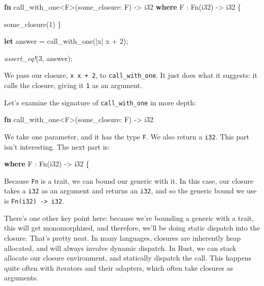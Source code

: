 \documentclass[a4paper,]{book}
\newenvironment{Shaded}{\begin{snugshade}}{\end{snugshade}}
\newcommand{\KeywordTok}[1]{\textcolor[rgb]{0.13,0.29,0.53}{\textbf{{#1}}}}
\newcommand{\DataTypeTok}[1]{\textcolor[rgb]{0.13,0.29,0.53}{{#1}}}
\newcommand{\DecValTok}[1]{\textcolor[rgb]{0.00,0.00,0.81}{{#1}}}
\newcommand{\BuiltInTok}[1]{{#1}}
\newcommand{\PreprocessorTok}[1]{\textcolor[rgb]{0.56,0.35,0.01}{\textit{{#1}}}}
\newcommand{\NormalTok}[1]{{#1}}
\begin{document}
\begin{Shaded}
\begin{Highlighting}[]
\KeywordTok{fn} \NormalTok{call_with_one<F>(some_closure: F) -> }\DataTypeTok{i32}
    \KeywordTok{where} \NormalTok{F : }\BuiltInTok{Fn}\NormalTok{(}\DataTypeTok{i32}\NormalTok{) -> }\DataTypeTok{i32} \NormalTok{\{}

    \NormalTok{some_closure(}\DecValTok{1}\NormalTok{)}
\NormalTok{\}}

\KeywordTok{let} \NormalTok{answer = call_with_one(|x| x + }\DecValTok{2}\NormalTok{);}

\PreprocessorTok{assert_eq!}\NormalTok{(}\DecValTok{3}\NormalTok{, answer);}
\end{Highlighting}
\end{Shaded}

We pass our closure, \texttt{\textbar{}x\textbar{}\ x\ +\ 2}, to
\texttt{call\_with\_one}. It just does what it suggests: it calls the
closure, giving it \texttt{1} as an argument.

Let's examine the signature of \texttt{call\_with\_one} in more depth:

\begin{Shaded}
\begin{Highlighting}[]
\KeywordTok{fn} \NormalTok{call_with_one<F>(some_closure: F) -> }\DataTypeTok{i32}
\end{Highlighting}
\end{Shaded}

We take one parameter, and it has the type \texttt{F}. We also return a
\texttt{i32}. This part isn't interesting. The next part is:

\begin{Shaded}
\begin{Highlighting}[]
    \KeywordTok{where} \NormalTok{F : }\BuiltInTok{Fn}\NormalTok{(}\DataTypeTok{i32}\NormalTok{) -> }\DataTypeTok{i32} \NormalTok{\{}
\end{Highlighting}
\end{Shaded}

Because \texttt{Fn} is a trait, we can bound our generic with it. In
this case, our closure takes a \texttt{i32} as an argument and returns
an \texttt{i32}, and so the generic bound we use is
\texttt{Fn(i32)\ -\textgreater{}\ i32}.

There's one other key point here: because we're bounding a generic with
a trait, this will get monomorphized, and therefore, we'll be doing
static dispatch into the closure. That's pretty neat. In many languages,
closures are inherently heap allocated, and will always involve dynamic
dispatch. In Rust, we can stack allocate our closure environment, and
statically dispatch the call. This happens quite often with iterators
and their adapters, which often take closures as arguments.
\end{document}
